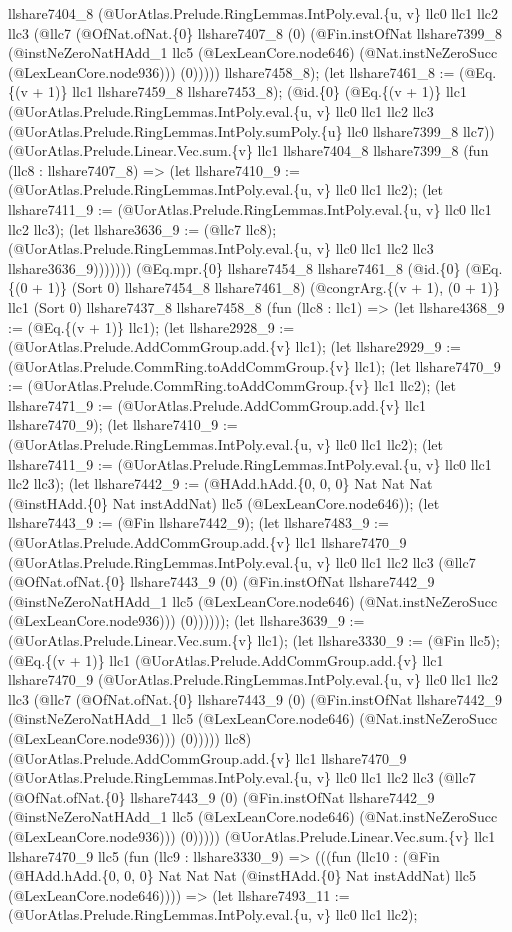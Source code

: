 \documentclass[11pt]{article}
\begin{document}
llshare7404\_8 (@UorAtlas.Prelude.RingLemmas.IntPoly.eval.\{u, v\} llc0 llc1 llc2 llc3 (@llc7 (@OfNat.ofNat.\{0\} llshare7407\_8 (0) (@Fin.instOfNat llshare7399\_8 (@instNeZeroNatHAdd\_1 llc5 (@LexLeanCore.node646) (@Nat.instNeZeroSucc (@LexLeanCore.node936))) (0))))) llshare7458\_8); (let llshare7461\_8 := (@Eq.\{(v + 1)\} llc1 llshare7459\_8 llshare7453\_8); (@id.\{0\} (@Eq.\{(v + 1)\} llc1 (@UorAtlas.Prelude.RingLemmas.IntPoly.eval.\{u, v\} llc0 llc1 llc2 llc3 (@UorAtlas.Prelude.RingLemmas.IntPoly.sumPoly.\{u\} llc0 llshare7399\_8 llc7)) (@UorAtlas.Prelude.Linear.Vec.sum.\{v\} llc1 llshare7404\_8 llshare7399\_8 (fun (llc8 : llshare7407\_8) => (let llshare7410\_9 := (@UorAtlas.Prelude.RingLemmas.IntPoly.eval.\{u, v\} llc0 llc1 llc2); (let llshare7411\_9 := (@UorAtlas.Prelude.RingLemmas.IntPoly.eval.\{u, v\} llc0 llc1 llc2 llc3); (let llshare3636\_9 := (@llc7 llc8); (@UorAtlas.Prelude.RingLemmas.IntPoly.eval.\{u, v\} llc0 llc1 llc2 llc3 llshare3636\_9))))))) (@Eq.mpr.\{0\} llshare7454\_8 llshare7461\_8 (@id.\{0\} (@Eq.\{(0 + 1)\} (Sort 0) llshare7454\_8 llshare7461\_8) (@congrArg.\{(v + 1), (0 + 1)\} llc1 (Sort 0) llshare7437\_8 llshare7458\_8 (fun (llc8 : llc1) => (let llshare4368\_9 := (@Eq.\{(v + 1)\} llc1); (let llshare2928\_9 := (@UorAtlas.Prelude.AddCommGroup.add.\{v\} llc1); (let llshare2929\_9 := (@UorAtlas.Prelude.CommRing.toAddCommGroup.\{v\} llc1); (let llshare7470\_9 := (@UorAtlas.Prelude.CommRing.toAddCommGroup.\{v\} llc1 llc2); (let llshare7471\_9 := (@UorAtlas.Prelude.AddCommGroup.add.\{v\} llc1 llshare7470\_9); (let llshare7410\_9 := (@UorAtlas.Prelude.RingLemmas.IntPoly.eval.\{u, v\} llc0 llc1 llc2); (let llshare7411\_9 := (@UorAtlas.Prelude.RingLemmas.IntPoly.eval.\{u, v\} llc0 llc1 llc2 llc3); (let llshare7442\_9 := (@HAdd.hAdd.\{0, 0, 0\} Nat Nat Nat (@instHAdd.\{0\} Nat instAddNat) llc5 (@LexLeanCore.node646)); (let llshare7443\_9 := (@Fin llshare7442\_9); (let llshare7483\_9 := (@UorAtlas.Prelude.AddCommGroup.add.\{v\} llc1 llshare7470\_9 (@UorAtlas.Prelude.RingLemmas.IntPoly.eval.\{u, v\} llc0 llc1 llc2 llc3 (@llc7 (@OfNat.ofNat.\{0\} llshare7443\_9 (0) (@Fin.instOfNat llshare7442\_9 (@instNeZeroNatHAdd\_1 llc5 (@LexLeanCore.node646) (@Nat.instNeZeroSucc (@LexLeanCore.node936))) (0)))))); (let llshare3639\_9 := (@UorAtlas.Prelude.Linear.Vec.sum.\{v\} llc1); (let llshare3330\_9 := (@Fin llc5); (@Eq.\{(v + 1)\} llc1 (@UorAtlas.Prelude.AddCommGroup.add.\{v\} llc1 llshare7470\_9 (@UorAtlas.Prelude.RingLemmas.IntPoly.eval.\{u, v\} llc0 llc1 llc2 llc3 (@llc7 (@OfNat.ofNat.\{0\} llshare7443\_9 (0) (@Fin.instOfNat llshare7442\_9 (@instNeZeroNatHAdd\_1 llc5 (@LexLeanCore.node646) (@Nat.instNeZeroSucc (@LexLeanCore.node936))) (0))))) llc8) (@UorAtlas.Prelude.AddCommGroup.add.\{v\} llc1 llshare7470\_9 (@UorAtlas.Prelude.RingLemmas.IntPoly.eval.\{u, v\} llc0 llc1 llc2 llc3 (@llc7 (@OfNat.ofNat.\{0\} llshare7443\_9 (0) (@Fin.instOfNat llshare7442\_9 (@instNeZeroNatHAdd\_1 llc5 (@LexLeanCore.node646) (@Nat.instNeZeroSucc (@LexLeanCore.node936))) (0))))) (@UorAtlas.Prelude.Linear.Vec.sum.\{v\} llc1 llshare7470\_9 llc5 (fun (llc9 : llshare3330\_9) => (((fun (llc10 : (@Fin (@HAdd.hAdd.\{0, 0, 0\} Nat Nat Nat (@instHAdd.\{0\} Nat instAddNat) llc5 (@LexLeanCore.node646)))) => (let llshare7493\_11 := (@UorAtlas.Prelude.RingLemmas.IntPoly.eval.\{u, v\} llc0 llc1 llc2); 
\end{document}
